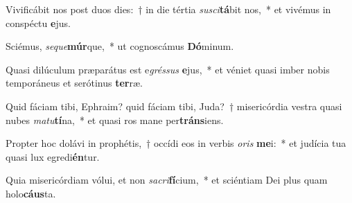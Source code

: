 \item Vivificábit nos post duos dies:~† in die tértia \textit{su}\textit{sci}\textbf{tá}bit nos,~* et vivémus in conspéctu \textbf{e}jus.
\item Sciémus, \textit{se}\textit{que}\textbf{múr}que,~* ut cognoscámus \textbf{Dó}minum.
\item Quasi dilúculum præparátus est e\textit{grés}\textit{sus} \textbf{e}jus,~* et véniet quasi imber nobis temporáneus et serótinus \textbf{ter}ræ.
\item Quid fáciam tibi, Ephraim? quid fáciam tibi, Juda?~† misericórdia vestra quasi nubes \textit{ma}\textit{tu}\textbf{tí}na,~* et quasi ros mane per\textbf{tráns}iens.
\item Propter hoc dolávi in prophétis,~† occídi eos in verbis \textit{o}\textit{ris} \textbf{me}i:~* et judícia tua quasi lux egredi\textbf{én}tur.
\item Quia misericórdiam vólui, et non \textit{sa}\textit{cri}\textbf{fí}cium,~* et sciéntiam Dei plus quam holo\textbf{cáus}ta.
